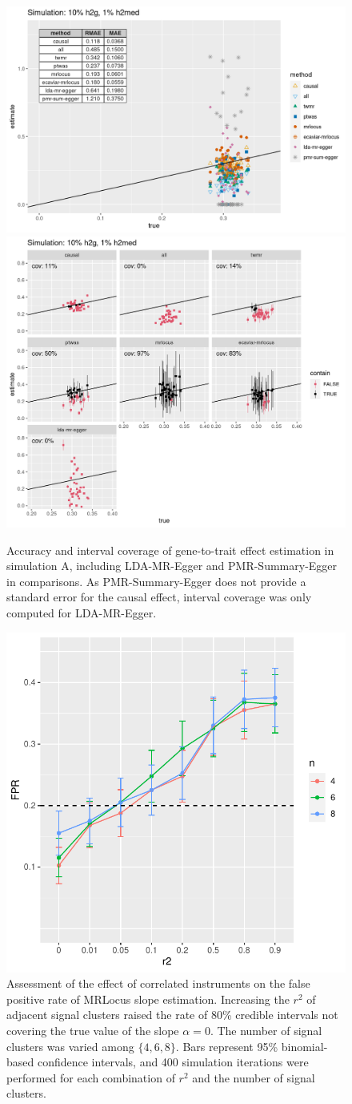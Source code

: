 \documentclass[11pt]{article}
\begin{document}
\begin{figure}[!ht]
  \centering
  \includegraphics[width=.5\textwidth]{figs/sim1extra2.png}
  \includegraphics[width=.4\textwidth]{figs/cover1extra2.png}
  \caption{Accuracy and interval coverage of gene-to-trait effect
    estimation in simulation A, including LDA-MR-Egger and
    PMR-Summary-Egger in comparisons. As PMR-Summary-Egger does not
    provide a standard error for the causal effect, interval
    coverage was only computed for LDA-MR-Egger.}
\end{figure}

\begin{figure}[!ht]
  \centering
  \includegraphics[width=.5\textwidth]{figs/corr_instr_sim}
  \caption{Assessment of the effect of correlated instruments on the
    false positive rate of MRLocus slope estimation. Increasing the
    $r^2$ of adjacent signal clusters raised the rate of 80\% credible
    intervals not covering the true value of the slope $\alpha =
    0$. The number of signal clusters was varied among $\{4,6,8\}$.
    Bars represent 95\% binomial-based confidence intervals, and 400
    simulation iterations were performed for each combination of $r^2$
    and the number of signal clusters.}
\end{figure}
\end{document}
